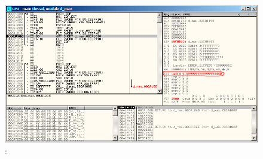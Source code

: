 \begin{figure}[H]
\centering
\includegraphics[scale=\FigScale]{patterns/12_FPU/3_comparison/x86/MSVC/olly2_5.png}
\caption{\olly: }
\label{fig:FPU_comparison_case2_olly5}
\end{figure}
